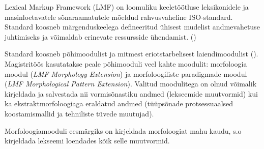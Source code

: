 \documentclass[12pt,a4paper]{article}
\begin{document}

Lexical Markup Framework (LMF) on loomuliku keeletöötluse leksikonidele ja masin\-loetavatele sõna\-raamatutele mõeldud rahvusvaheline ISO-standard. Standard koosneb märgenduskeelega defineeritud ühisest mudelist andmevahetuse juhtimiseks ja võimaldab erinevate ressursside ühendamist. (\cite[1]{francopoulo_lmf_2013})

Standard koosneb põhimoodulist ja mitmest eri\-otstarbelisest laiendi\-moodulist (\cite[22]{francopoulo_lmf_2013}). Magistritöös kasutatakse peale põhimooduli veel kahte moodulit: morfoloogia moodul (\textit{LMF Morphology Extension}) ja morfoloogiliste paradigmade moodul (\textit{LMF Morphological Pattern Extension}). Valitud moodulitega on olnud võimalik kirjeldada ja salvestada nii vormisõnastiku andmed (lekseemide muutvormid) kui ka ekstrakt\-morfoloogiaga eraldatud andmed (tüüpsõnade protsessuaalsed koostamis\-mallid ja tehniliste tüvede muutujad).

Morfoloogiamooduli eesmärgiks on kirjeldada morfoloogiat mahu kaudu, s.o kirjeldada lekseemi loendades kõik selle muutvormid.
\end{document}
